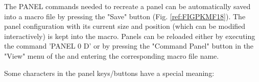 The PANEL commands needed to recreate a panel can be automatically
saved into a macro file by pressing the "Save" button  (Fig.
\ref{ref:FIGPKMF18}).  The panel  configuration with its current
size and position
(which can be modified interactively) is kept into the macro.
Panels can be reloaded either by executing the command 'PANEL 0 D'
or by pressing the "Command Panel" button in the "View" menu
of the \EW{} and entering the corresponding macro file name.

Some characters in the panel keys/buttons have a special meaning:

 
